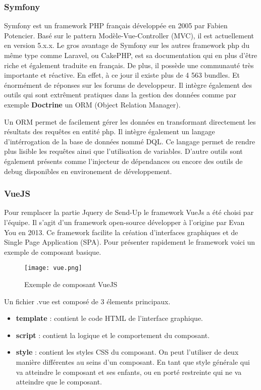 \subsubsection{Symfony}
Symfony\cite{symfony} est un framework PHP français développée en 2005 par Fabien Potencier. Basé sur le pattern Modèle-Vue-Controller (MVC), il est actuellement en version 5.x.x.  Le gros avantage de Symfony sur les autres framework php du même type comme Laravel, ou CakePHP, est sa documentation qui en plus d'être riche et également traduite en français. De plus, il possède une communauté très importante et réactive. En effet, à ce jour il existe plus de 4 563 bundles. Et énormément de réponses sur les forums de developpeur. Il intègre également des outils qui sont extrêment pratiques dans la gestion des données comme par exemple \textbf{Doctrine}\cite{doctrine} un ORM (Object Relation Manager).

Un ORM permet de facilement gérer les données en transformant directement les résultats des requêtes en entité php. Il intègre également un langage d'intérrogation de la base de données nommé DQL. Ce langage permet de rendre plus lisible les requêtes ainsi que l'utilisation de variables. D'autre outils sont également présents comme l'injecteur de dépendances ou encore des outils de debug disponibles en environement de développement.  


\subsubsection{VueJS}
Pour remplacer la partie Jquery de Send-Up le framework VueJs\cite{vue} a été choisi par l'équipe. Il s'agit d'un framework open-source développer à l'origine par Evan You en 2013. Ce framework facilite la création d'interfaces graphiques et de Single Page Application (SPA). Pour présenter rapidement le framework voici un exemple de composant basique. 

\begin{figure}[htbp]
    \center
    \texttt{[image: vue.png]}
    \caption{Exemple de composant VueJS}
\end{figure}

Un fichier .vue est composé de 3 élements principaux.
\begin{itemize}
    \item \textbf{template} : contient le code HTML de l'interface graphique.
    \item \textbf{script} : contient la logique et le comportement du composant. 
    \item \textbf{style} : contient les styles CSS du composant. On peut l'utiliser de deux manière différentes au seins d'un composant. En tant que style générale qui va atteindre le composant et ses enfants, ou en porté restreinte qui ne va atteindre que le composant. 
\end{itemize}


